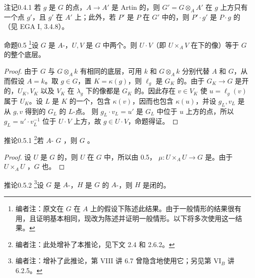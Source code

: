 \begin{SGAresult}{注记}{0.4.1}
若 $g$ 是 $G$ 的点，$A\to A'$ 是 Artin 的，则 $G'=G\otimes_A A'$ 在 $g$ 上方只有一个点 $g'$，且 $g'$ 在 $A'$ 上；此外，若 $P'$ 是 $P$ 在 $G'$ 中的，则 $P'\cdot g'$ 是 $P\cdot g$ 的（见 EGA I, 3.4.8）。
\end{SGAresult}
\begin{SGAresult}{命题}{0.5}
\footnote{编者注：原文在 $G$ 在 $A$ 上的假设下陈述此结果。由于一般情形的结果很有用，且证明基本相同，现改为陈述并证明一般情形。以下将多次使用这一结果。}设 $G$ 是 $A$-，$U,V$ 是 $G$ 中两个。则 $U\cdot V$（即 $U\times_A V$ 在下的像）等于 $G$ 的整个底层。
\end{SGAresult}
\begin{proof}
由于 $G$ 与 $G\otimes_A k$ 有相同的底层，可用 $k$ 和 $G\otimes_A k$ 分别代替 $A$ 和 $G$，从而假设 $A=k$。取 $g\in G$，置 $K=\kappa(g)$，则 $\ell_g$ 是 $G_K$ 的。由于 $G_K\to G$ 是开的，$U_K,V_K$ 以及 $V_K$ 在 $\lambda_g$ 下的像都是 $G_K$ 的。因此存在 $v\in V_K$ 使 $u=\ell_g(v)$ 属于 $U_K$。设 $L$ 是 $K$ 的一个，包含 $\kappa(v)$，因而也包含 $\kappa(u)$，并设 $g_L,v_L$ 是从 $g,v$ 得到的 $G_L$ 的 $L$-点。
则 $g_L\cdot v_L=u'$ 是 $G_L$ 中位于 $u$ 上方的点，所以 $g_L=u'\cdot v_L^{-1}$ 位于 $U\cdot V$ 上方，故 $g\in U\cdot V$，命题得证。
\end{proof}
\begin{SGAresult}{推论}{0.5.1}
\footnote{编者注：此处增补了本推论，见下文 2.4 和 2.6.2。}若 $A$- $G$ ，则 $G$ 。
\end{SGAresult}
\begin{proof}
设 $U$ 是 $G$ 的，则 $U$ 在 $G$ 中，所以由 0.5， $\mu:U\times_A U\to G$ 是。由于 $U\times_A U$ ，$G$ 也。
\end{proof}
\begin{SGAresult}{推论}{0.5.2}
\footnote{编者注：增补了此推论，第 VIII 讲 6.7 曾隐含地使用它；另见第 VI$_B$ 讲 6.2.5。}设 $G$ 是 $A$-，$H$ 是 $G$ 的 $A$-，则 $H$ 是闭的。
\end{SGAresult}
